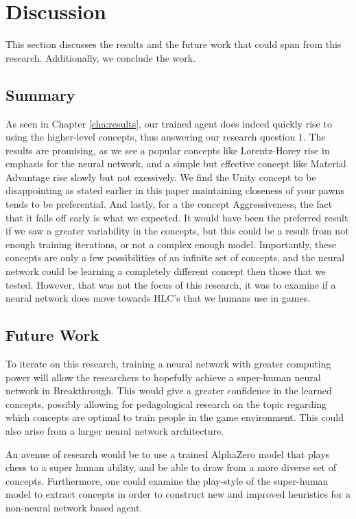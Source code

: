 \chapter{Discussion}

This section discusses the results and the future work that could span from this research. Additionally, we conclude the work.

\section{Summary}

As seen in Chapter \ref{cha:results}, our trained agent does indeed quickly rise to using the higher-level concepts, thus answering our research question $1$. The results are promising, as we see a popular concepts like Lorentz-Horey rise in emphasis for the neural network, and a simple but effective concept like Material Advantage rise slowly but not exessively. We find the Unity concept to be disappointing as stated earlier in this paper maintaining closeness of your pawns tends to be preferential. And lastly, for a the concept Aggressiveness, the fact that it falls off early is what we expected. It would have been the preferred result if we saw a greater variability in the concepts, but this could be a result from not enough training iterations, or not a complex enough model. Importantly, these concepts are only a few possibilities of an infinite set of concepts, and the neural network could be learning a completely different concept then those that we tested. However, that was not the focus of this research, it was to examine if a neural network does move towards HLC's that we humans use in games.

\section{Future Work}

To iterate on this research, training a neural network with greater computing power will allow the researchers to hopefully achieve a super-human neural network in Breakthrough. This would give a greater confidence in the learned concepts, possibly allowing for pedagological research on the topic regarding which concepts are optimal to train people in the game environment. This could also arise from a larger neural network architecture.

An avenue of research would be to use a trained AlphaZero model that plays chess to a super human ability, and be able to draw from a more diverse set of concepts. Furthermore, one could examine the play-style of the super-human model to extract concepts in order to construct new and improved heuristics for a non-neural network based agent.

